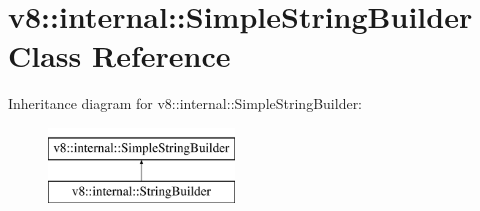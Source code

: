 \hypertarget{classv8_1_1internal_1_1SimpleStringBuilder}{}\section{v8\+:\+:internal\+:\+:Simple\+String\+Builder Class Reference}
\label{classv8_1_1internal_1_1SimpleStringBuilder}
Inheritance diagram for v8\+:\+:internal\+:\+:Simple\+String\+Builder\+:\begin{figure}[H]
\begin{center}
\leavevmode
\includegraphics[height=2.000000cm]{classv8_1_1internal_1_1SimpleStringBuilder}
\end{center}
\end{figure}
